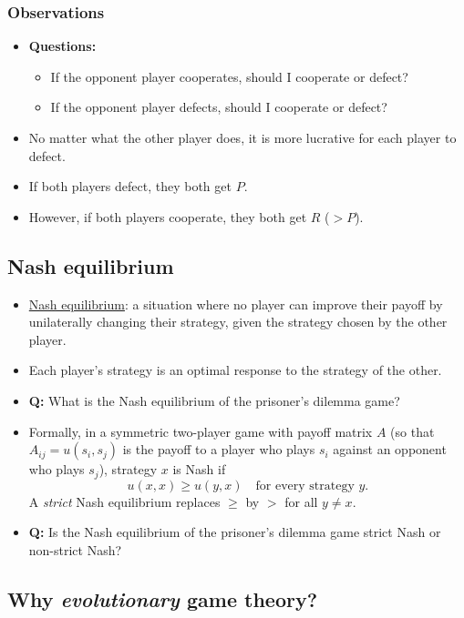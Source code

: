 \documentclass[20pt]{extarticle}
\begin{document}
\subsubsection*{Observations}

\begin{itemize}
\item \textbf{Questions:}
	\begin{itemize}
	\item If the opponent player cooperates, should I cooperate or defect?
	\item If the opponent player defects, should I cooperate or defect?
	\end{itemize}
\item No matter what the other player does, it is more lucrative for each player to defect.
\item If both players defect, they both get $P$.
\item However, if both players cooperate, they both get $R$ ($>P$).
\end{itemize}

\subsection*{Nash equilibrium}

\begin{itemize}
\item \underline{Nash equilibrium}: a situation where no player can improve their payoff by unilaterally changing their strategy, given the strategy chosen by the other player.
\item Each player's strategy is an optimal response to the strategy of the other.
\item \textbf{Q:} What is the Nash equilibrium of the prisoner's dilemma game?
\item Formally, in a symmetric two-player game with payoff matrix $A$ (so that $A_{ij} = u(s_i, s_j)$ is the payoff to a player who plays $s_i$ against an opponent who plays $s_j$), strategy $x$ is Nash if
\[ u(x,x) \ge u(y,x) \quad \text{for every strategy } y. \]
A \emph{strict} Nash equilibrium replaces $\ge$ by $>$ for all $y \neq x$.
\item \textbf{Q:} Is the Nash equilibrium of the prisoner's dilemma game strict Nash or non-strict Nash?
\end{itemize}

\subsection*{Why \emph{evolutionary} game theory?}
\end{document}
